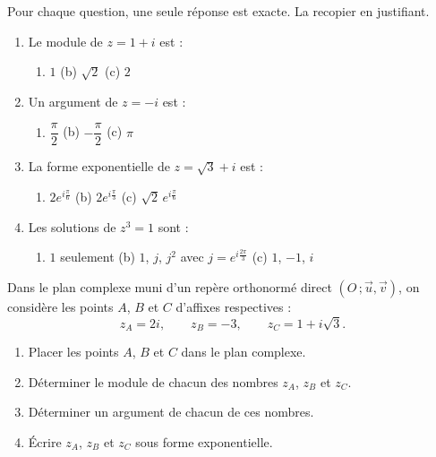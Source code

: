 \documentclass[11pt]{article}
\begin{document}
\begin{exercice}[QCM]
Pour chaque question, une seule réponse est exacte. La recopier en justifiant.
\begin{enumerate}
\item Le module de $z = 1 + i$ est :
\begin{enumerate}
\item $1$ \qquad (b) $\sqrt{2}$ \qquad (c) $2$
\end{enumerate}
\item Un argument de $z = -i$ est :
\begin{enumerate}
\item $\dfrac{\pi}{2}$ \qquad (b) $-\dfrac{\pi}{2}$ \qquad (c) $\pi$
\end{enumerate}
\item La forme exponentielle de $z = \sqrt{3} + i$ est :
\begin{enumerate}
\item $2e^{i\frac{\pi}{6}}$ \qquad (b) $2e^{i\frac{\pi}{3}}$ \qquad (c) $\sqrt{2}\,e^{i\frac{\pi}{6}}$
\end{enumerate}
\item Les solutions de $z^3 = 1$ sont :
\begin{enumerate}
\item $1$ seulement \qquad (b) $1$, $j$, $j^2$ avec $j = e^{i\frac{2\pi}{3}}$ \qquad (c) $1$, $-1$, $i$
\end{enumerate}
\end{enumerate}
\end{exercice}

\begin{exercice}
Dans le plan complexe muni d'un repère orthonormé direct $(O\,;\vec{u},\vec{v})$, on considère les points $A$, $B$ et $C$ d'affixes respectives :
\[ z_A = 2i, \qquad z_B = -3, \qquad z_C = 1 + i\sqrt{3}. \]
\begin{enumerate}
\item Placer les points $A$, $B$ et $C$ dans le plan complexe.
\item Déterminer le module de chacun des nombres $z_A$, $z_B$ et $z_C$.
\item Déterminer un argument de chacun de ces nombres.
\item Écrire $z_A$, $z_B$ et $z_C$ sous forme exponentielle.
\end{enumerate}
\end{exercice}
\end{document}
